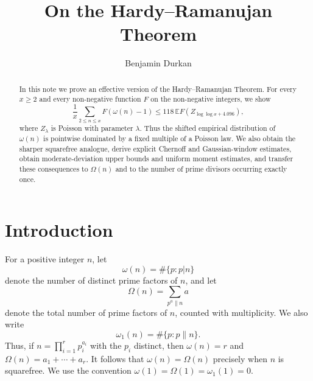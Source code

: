 \documentclass[12pt,a4paper,reqno]{amsart}
\theoremstyle{plain}
\numberwithin{sblmm}{thrm}
\numberwithin{equation}{section}
\begin{document}
\title{On the Hardy--Ramanujan Theorem}
\author[B. Durkan]{Benjamin Durkan}
\address{Department of Mathematics, University of Manchester, Oxford Road, Manchester, M13 9PL}

\begin{abstract}
    In this note we prove an effective version of the Hardy--Ramanujan Theorem. For every $x\ge 2$ and every non-negative function $F$ on the non-negative integers, we show 
    $$\frac{1}{x}\sum_{2\le n\le x}F(\omega(n)-1)\le 118\,\mathbb{E}F(Z_{\log\log x+4.096}),$$
    where $Z_{\lambda}$ is Poisson with parameter $\lambda$. Thus the shifted empirical distribution of $\omega(n)$ is pointwise dominated by a fixed multiple of a Poisson law. We also obtain the sharper squarefree analogue, derive explicit Chernoff and Gaussian-window estimates, obtain moderate-deviation upper bounds and uniform moment estimates, and transfer these consequences to $\Omega(n)$ and to the number of prime divisors occurring exactly once.
\end{abstract}

\maketitle
\section{Introduction}
For a positive integer $n$, let $$\omega(n)=\#\{p:p|n\}$$ denote the number of distinct prime factors of $n$, and let $$\Omega(n)=\sum_{p^a\lVert n}a$$ denote the total number of prime factors of $n$, counted with multiplicity. We also write
$$\omega_1(n)=\#\{p:p\lVert n\}.$$
Thus, if $n=\prod_{i=1}^rp_i^{a_i}$ with the $p_i$ distinct, then $\omega(n)=r$ and $\Omega(n)=a_1+\cdots+a_r$. It follows that $\omega(n)=\Omega(n)$ precisely when $n$ is squarefree. We use the convention $\omega(1)=\Omega(1)=\omega_1(1)=0$.
\end{document}
